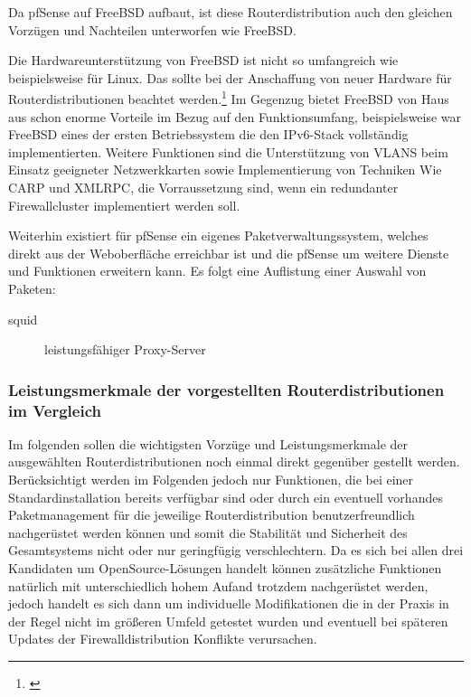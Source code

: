 \documentclass[a4paper,12pt]{scrartcl}
\begin{document}
Da pfSense auf FreeBSD aufbaut, ist diese Routerdistribution auch den gleichen
Vorz\"ugen und Nachteilen unterworfen wie FreeBSD.

Die Hardwareunterst\"utzung von FreeBSD ist nicht so umfangreich wie
beispielsweise f\"ur Linux. Das sollte bei der Anschaffung von neuer Hardware
f\"ur Routerdistributionen beachtet werden.\footnote{\cite{FreeBSDHardware}} Im
Gegenzug bietet FreeBSD von Haus aus schon enorme Vorteile im Bezug auf den
Funktionsumfang, beispielsweise war FreeBSD eines der ersten Betriebssystem die
den IPv6-Stack vollst\"andig implementierten. Weitere Funktionen sind die
Unterst\"utzung von VLANS beim Einsatz geeigneter Netzwerkkarten sowie
Implementierung von Techniken Wie CARP und XMLRPC, die Vorraussetzung sind, wenn
ein redundanter Firewallcluster implementiert werden soll.

Weiterhin existiert f\"ur pfSense ein eigenes Paketverwaltungssystem, welches
direkt aus der Weboberfl\"ache erreichbar ist und die pfSense um weitere
Dienste und Funktionen erweitern kann. Es folgt eine Auflistung einer Auswahl
von Paketen:
\begin{description}
 \item[squid] leistungsf\"ahiger Proxy-Server 
\end{description}



\subsubsection{Leistungsmerkmale der vorgestellten Routerdistributionen im
Vergleich}
Im folgenden sollen die wichtigsten Vorz\"uge und Leistungsmerkmale der
ausgew\"ahlten Routerdistributionen noch einmal direkt gegen\"uber gestellt
werden.\\


Ber\"ucksichtigt werden im Folgenden jedoch nur Funktionen, die bei einer
Standardinstallation bereits verf\"ugbar sind oder durch ein eventuell
vorhandes Paketmanagement f\"ur die jeweilige Routerdistribution
benutzerfreundlich nachger\"ustet werden k\"onnen und somit die Stabilit\"at
und Sicherheit des Gesamtsystems nicht oder nur geringf\"ugig verschlechtern.
Da es sich bei allen drei Kandidaten um OpenSource-L\"osungen handelt k\"onnen
zus\"atzliche Funktionen nat\"urlich mit unterschiedlich hohem Aufand trotzdem
nachger\"ustet werden, jedoch handelt es sich dann um individuelle
Modifikationen die in der Praxis in der Regel nicht im gr\"o\ss{}eren Umfeld
getestet wurden und eventuell bei sp\"ateren Updates der Firewalldistribution
Konflikte verursachen.\\
\end{document}
